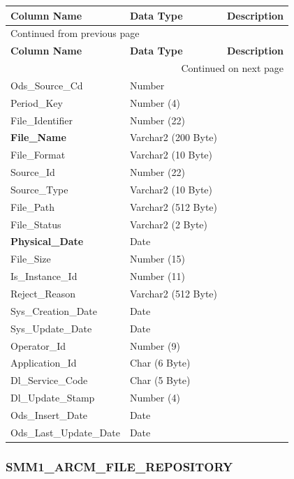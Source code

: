 \documentclass[12pt,twoside]{article}
\begin{document}
\begin{longtable}{l|l|l}
\hline
\textbf{Column Name} & \textbf{Data Type} & \textbf{Description}\\
\hline
\endfirsthead
\multicolumn{3}{l}{Continued from previous page} \\
\hline

\textbf{Column Name} & \textbf{Data Type} & \textbf{Description} \\

\hline
\endhead
\hline\multicolumn{3}{r}{Continued on next page} \\
\endfoot
\endlastfoot
\hline
Ods\_Source\_Cd & Number & \\
Period\_Key & Number (4) & \\
File\_Identifier & Number (22) & \\
\textbf{File\_Name} & Varchar2 (200 Byte) & \\
File\_Format & Varchar2 (10 Byte) & \\
Source\_Id & Number (22) & \\
Source\_Type & Varchar2 (10 Byte) & \\
File\_Path & Varchar2 (512 Byte) & \\
File\_Status & Varchar2 (2 Byte) & \\
\textbf{Physical\_Date} & Date & \\
File\_Size & Number (15) & \\
Is\_Instance\_Id & Number (11) & \\
Reject\_Reason & Varchar2 (512 Byte) & \\
Sys\_Creation\_Date & Date & \\
Sys\_Update\_Date & Date & \\
Operator\_Id & Number (9) & \\
Application\_Id & Char (6 Byte) & \\
Dl\_Service\_Code & Char (5 Byte) & \\
Dl\_Update\_Stamp & Number (4) & \\
Ods\_Insert\_Date & Date & \\
Ods\_Last\_Update\_Date & Date & \\
\hline
\end{longtable}

\normalsize
\subsubsection{SMM1\_ARCM\_FILE\_REPOSITORY}
\label{sec:orgheadline134}
\footnotesize
\end{document}
